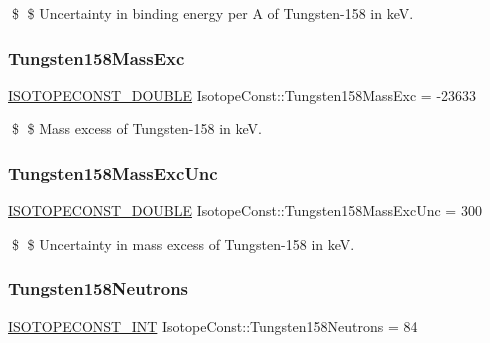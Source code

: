 \$ \$ Uncertainty in binding energy per A of Tungsten-\/158 in keV. \mbox{\label{group___isotope_const-_tungsten-_w158_ga8c3b0c8a01931e2eb8797f2bd444411e}} 
\subsubsection{\texorpdfstring{Tungsten158\+Mass\+Exc}{Tungsten158MassExc}}
{\footnotesize\ttfamily \mbox{\hyperlink{group___isotope_const-_macros_ga8f45a7272ce02c0b4c65c44636ed719a}{I\+S\+O\+T\+O\+P\+E\+C\+O\+N\+S\+T\+\_\+\+D\+O\+U\+B\+LE}} Isotope\+Const\+::\+Tungsten158\+Mass\+Exc = -\/23633}

\$ \$ Mass excess of Tungsten-\/158 in keV. \mbox{\label{group___isotope_const-_tungsten-_w158_gac3ce1e5b58ec08ee42e114e27e9f77be}} 
\subsubsection{\texorpdfstring{Tungsten158\+Mass\+Exc\+Unc}{Tungsten158MassExcUnc}}
{\footnotesize\ttfamily \mbox{\hyperlink{group___isotope_const-_macros_ga8f45a7272ce02c0b4c65c44636ed719a}{I\+S\+O\+T\+O\+P\+E\+C\+O\+N\+S\+T\+\_\+\+D\+O\+U\+B\+LE}} Isotope\+Const\+::\+Tungsten158\+Mass\+Exc\+Unc = 300}

\$ \$ Uncertainty in mass excess of Tungsten-\/158 in keV. \mbox{\label{group___isotope_const-_tungsten-_w158_ga72c5507e6c9d36b8096bc01bd0db118a}} 
\subsubsection{\texorpdfstring{Tungsten158\+Neutrons}{Tungsten158Neutrons}}
{\footnotesize\ttfamily \mbox{\hyperlink{group___isotope_const-_macros_ga5f18360b3e99483a35c32d789e62621c}{I\+S\+O\+T\+O\+P\+E\+C\+O\+N\+S\+T\+\_\+\+I\+NT}} Isotope\+Const\+::\+Tungsten158\+Neutrons = 84}

